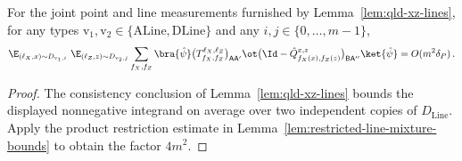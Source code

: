 \begin{lemma}
	\label{lem:qld-xz-lines-restricted}
	\notready
	For the joint point and line measurements furnished by
	Lemma~\ref{lem:qld-xz-lines}, for any types
	$\mathrm{v}_1, \mathrm{v}_2 \in \{\mathrm{ALine},\mathrm{DLine}\}$ and
	any $i, j \in \{0, \dots, m-1\}$,
	\begin{equation}
		\label{eq:qld-xz-lines-restricted}
		\E_{(\ell_X,x) \sim D_{\mathrm{v}_1,i}}\
		\E_{(\ell_Z,z) \sim D_{\mathrm{v}_2,j}}
		\sum_{f_X,f_Z}
		\bra{\hat\psi}
		\big(T^{\ell_X,\ell_Z}_{f_X,f_Z}\big)_{\mathsf{A}\mathsf{A}'}
		\ot
		\big(\Id - \hat{Q}^{x,z}_{f_X(x),f_Z(z)}
		\big)_{\mathsf{B}\mathsf{A}''}
		\ket{\hat\psi}
		= O(m^2 \delta_P)\,.
	\end{equation}
\end{lemma}
\begin{proof}
	The consistency conclusion of Lemma~\ref{lem:qld-xz-lines} bounds the
	displayed nonnegative integrand on average over two independent copies of
	$D_{\mathrm{Line}}$. Apply the product restriction estimate in
	Lemma~\ref{lem:restricted-line-mixture-bounds} to obtain the factor
	$4m^2$.
\end{proof}

